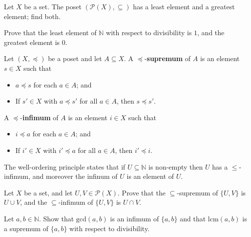 \begin{exercise}
Let $X$ be a set. The poset $(\mathcal{P}(X), \subseteq)$ has a least element and a greatest element; find both.
\end{exercise}

\begin{exercise}
Prove that the least element of $\mathbb{N}$ with respect to divisibility is $1$, and the greatest element is $0$.
\end{exercise}

\begin{definition}[Supremum]
\label{defSupremumInfimum}
Let $(X, \preceq)$ be a poset and let $A \subseteq X$. A $\preceq$-\textbf{supremum} of $A$ is an element $s \in X$ such that
\begin{itemize}
\item $a \preceq s$ for each $a \in A$; and
\item If $s' \in X$ with $a \preceq s'$ for all $a \in A$, then $s \preceq s'$.
\end{itemize}
A $\preceq$-\textbf{infimum} of $A$ is an element $i \in X$ such that
\begin{itemize}
\item $i \preceq a$ for each $a \in A$; and
\item If $i' \in X$ with $i' \preceq a$ for all $a \in A$, then $i' \preceq i$.
\end{itemize}
\end{definition}

\begin{example}
The well-ordering principle states that if $U \subseteq \mathbb{N}$ is non-empty then $U$ has a $\le$-infimum, and moreover the infinum of $U$ is an element of $U$.
\end{example}

\begin{exercise}
Let $X$ be a set, and let $U,V \in \mathcal{P}(X)$. Prove that the $\subseteq$-supremum of $\{ U, V \}$ is $U \cup V$, and the $\subseteq$-infimum of $\{ U, V \}$ is $U \cap V$.
\end{exercise}

\begin{exercise}
Let $a,b \in \mathbb{N}$. Show that $\mathrm{gcd}(a,b)$ is an infimum of $\{ a, b \}$ and that $\mathrm{lcm}(a,b)$ is a supremum of $\{ a, b \}$ with respect to divisibility.
\end{exercise}

